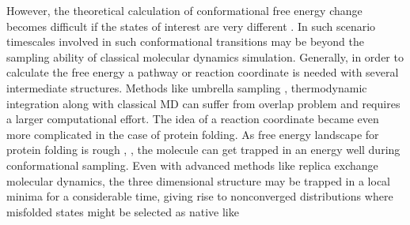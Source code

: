 \documentclass[12pt]{article}
\begin{document}
However, the theoretical calculation of conformational free energy change becomes difficult if the
states of interest are very different \cite{Meirovitch2007}. In such scenario timescales involved in
such conformational transitions may
be beyond the sampling ability of classical molecular dynamics simulation.  Generally, in order to
calculate the free energy a pathway or reaction coordinate is needed with several intermediate structures.
Methods like umbrella sampling \cite{Torrie1977}, thermodynamic integration \cite{Tironi1994} along with classical MD can suffer from
overlap problem and requires a larger computational effort. The idea of a reaction coordinate became
even more
complicated in the case of protein folding.  As free energy landscape for protein folding 
is rough \cite{Dill1997}, \cite{Dill2008}, the molecule 
can get trapped in an energy well during conformational sampling. Even with 
advanced methods like replica exchange molecular dynamics, the three dimensional structure may be
trapped in a local minima for a considerable time, giving rise to nonconverged distributions where
misfolded states might be selected as native like
\end{document}
